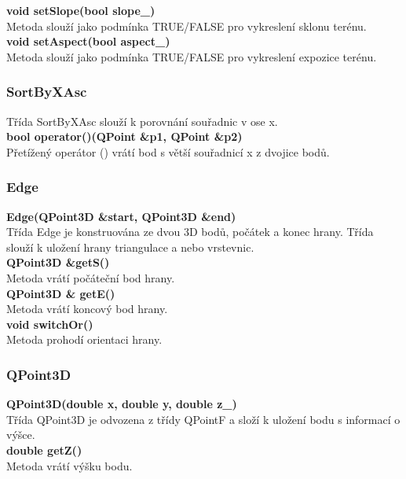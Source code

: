 \documentclass[a4paper, 12pt]{article}
\begin{document}
\textbf{void setSlope(bool slope\_)}\\
Metoda slouží jako podmínka TRUE/FALSE pro vykreslení sklonu terénu.\\

\textbf{void setAspect(bool aspect\_)}\\
Metoda slouží jako podmínka TRUE/FALSE pro vykreslení expozice terénu.\\



\subsubsection{SortByXAsc}
Třída SortByXAsc slouží k porovnání souřadnic v ose x.\\


\textbf{bool operator()(QPoint \&p1, QPoint \&p2)}\\
Přetížený operátor () vrátí bod s větší souřadnicí x z dvojice bodů.\\

\subsubsection{Edge}
\textbf{Edge(QPoint3D \&start, QPoint3D \&end)}\\
Třída Edge je konstruována ze dvou 3D bodů, počátek a konec hrany. Třída slouží k uložení hrany triangulace a nebo vrstevnic.\\
    
\textbf{QPoint3D \&getS()}\\
Metoda vrátí počáteční bod hrany.\\

\textbf{QPoint3D \& getE()}\\
Metoda vrátí koncový bod hrany.\\

\textbf{void switchOr()}\\
Metoda prohodí orientaci hrany.\\

\subsubsection{QPoint3D}
\textbf{QPoint3D(double x, double y, double z\_)}\\
Třída QPoint3D je odvozena z třídy QPointF a složí k uložení bodu s informací o výšce.\\

\textbf{double getZ()}\\
Metoda vrátí výšku bodu.\\
\end{document}
